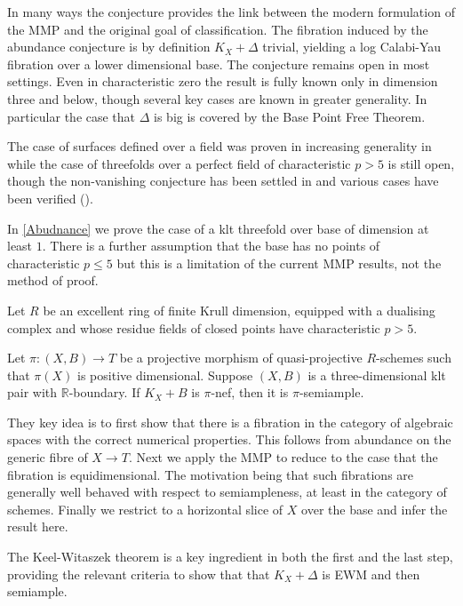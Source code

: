 \documentclass[a4paper,12pt]{book}
\begin{document}
	In many ways the conjecture provides the link between the modern formulation of the MMP and the original goal of classification. The fibration induced by the abundance conjecture is by definition $K_{X}+\Delta$ trivial, yielding a log Calabi-Yau fibration over a lower dimensional base. The conjecture remains open in most settings. Even in characteristic zero the result is fully known only in dimension three and below, though several key cases are known in greater generality. In particular the case that $\Delta$ is big is covered by the Base Point Free Theorem.

	The case of surfaces defined over a field was proven in increasing generality in \cite{fujino2012log, Tan14, tanaka2020abundance} while the case of threefolds over a perfect field of characteristic $p>5$ is still open, though the non-vanishing conjecture has been settled in \cite{XZ19, Wit} and various cases have been verified (\cite{DW19, Zha20}).
	
	In \autoref{Abudnance} we prove the case of a klt threefold over base of dimension at least $1$. There is a further assumption that the base has no points of characteristic $p \leq 5$ but this is a limitation of the current MMP results, not the method of proof.
	
	\begin{theo}\label{Main_Abund1}
		Let $R$ be an excellent ring of finite Krull dimension, equipped with a dualising complex and whose residue fields of closed points have characteristic $p>5$.
		
		Let $\pi \colon (X,B) \to T$ be a projective morphism of quasi-projective $R$-schemes such that $\pi(X)$ is positive dimensional.
		Suppose $(X,B)$ is a three-dimensional klt pair with $\mathbb{R}$-boundary. If $K_X+B$ is $\pi$-nef, then it is $\pi$-semiample.
	\end{theo}
	
	They key idea is to first show that there is a fibration in the category of algebraic spaces with the correct numerical properties. This follows from abundance on the generic fibre of $X \to T$. Next we apply the MMP to reduce to the case that the fibration is equidimensional. The motivation being that such fibrations are generally well behaved with respect to semiampleness, at least in the category of schemes. Finally we restrict to a horizontal slice of $X$ over the base and infer the result here.
	
	The Keel-Witaszek theorem is a key ingredient in both the first and the last step, providing the relevant criteria to show that that $K_{X}+\Delta$ is EWM and then semiample.
	
\end{document}
